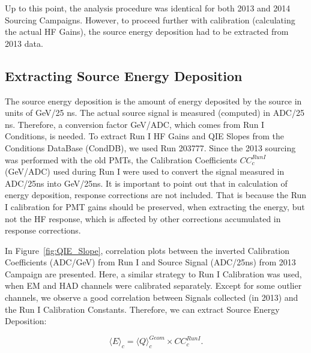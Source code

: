 Up to this point, the analysis procedure was identical for both 2013 and 2014
Sourcing Campaigns. However, to proceed further with calibration (calculating the
actual HF Gains), the source energy deposition had to be extracted from 2013 data.

\subsection{Extracting Source Energy Deposition}
The source energy deposition is the amount of energy deposited by the source in
units of GeV/25 ns. The actual source signal is measured (computed) in
ADC/25 ns. Therefore, a conversion factor GeV/ADC, which comes from
Run I Conditions, is needed. To extract Run I HF Gains and QIE Slopes from the Conditions DataBase (CondDB), we used Run 203777. Since the 2013 sourcing was performed with the old PMTs, the
Calibration Coefficients ${CC}^{Run I}_{c}$~ (GeV/ADC) used during Run I were used to convert
the signal measured in ADC/25\unit{ns} into GeV/25\unit{ns}. It is important to point out that in calculation of energy deposition, response corrections are not included. That is because the Run I calibration for PMT gains should be preserved, when extracting the energy, but not the HF response, which is affected by other corrections accumulated in response corrections.

In Figure~\ref{fig:QIE_Slope}, correlation plots between the inverted Calibration
Coefficients (ADC/GeV) from Run I and Source Signal (ADC/25\unit{ns}) from 2013
Campaign are presented. Here, a similar strategy to Run I Calibration was used, when
EM and HAD channels were calibrated separately. Except for some outlier channels,
we observe a good correlation between Signals collected (in 2013) and the Run I
Calibration Constants. Therefore, we can extract Source Energy Deposition:
\begin{center}
	\begin{equation}
		\label{eq:Edep}
		{\langle{E}\rangle}_{c} = {\langle{Q}\rangle}^{Geom}_{c} \times {CC^{Run I}_{c}}.
	\end{equation}
\end{center}

